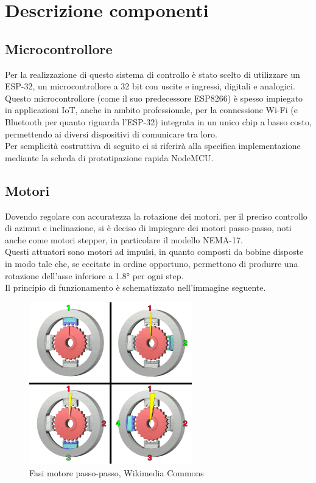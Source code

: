 \documentclass[12pt]{article}
\begin{document}
\section{Descrizione componenti}
    \subsection{Microcontrollore}
    Per la realizzazione di questo sistema di controllo è stato scelto di utilizzare un ESP-32, un microcontrollore a 32 bit con uscite e ingressi, digitali e analogici.\\
    Questo microcontrollore (come il suo predecessore ESP8266) è spesso impiegato in applicazioni IoT, anche in ambito professionale, per la connessione Wi-Fi (e Bluetooth per quanto riguarda l'ESP-32) integrata in un unico chip a basso costo, permettendo ai diversi dispositivi di comunicare tra loro.\\
    Per semplicità costruttiva di seguito ci si riferirà alla specifica implementazione me\-dian\-te la scheda di prototipazione rapida NodeMCU.
    
    \subsection{Motori}
    Dovendo regolare con accuratezza la rotazione dei motori, per il preciso controllo di azimut e inclinazione, si è deciso di impiegare dei motori passo-passo, noti anche come motori stepper, in particolare il modello NEMA-17.\\
    Questi attuatori sono motori ad impulsi, in quanto composti da bobine disposte in modo tale che, se eccitate in ordine opportuno, permettono di produrre una rotazione dell'asse inferiore a 1.8° per ogni step.\\
    Il principio di funzionamento è schematizzato nell'immagine seguente.\\
    
    
    
    \begin{figure}[h]
    \centering
        \includegraphics[width=200pt]{Draws/Animations/StepperMotor.png}
        \caption{Fasi motore passo-passo, Wikimedia Commons \protect\footnotemark}
    \end{figure}
    
\end{document}

